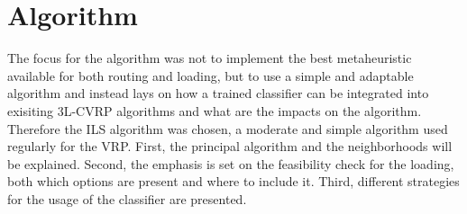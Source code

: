 \chapter{Algorithm}
\label{chap:algorithm}
The focus for the algorithm was not to implement the best metaheuristic available for both routing and loading, but
to use a simple and adaptable algorithm and instead lays on how a trained classifier can
be integrated into exisiting \gls{3L-CVRP} algorithms and what are the impacts on the algorithm. Therefore the \gls{ILS}
algorithm was chosen, a moderate and simple algorithm used regularly for the \gls{VRP}. First, the principal
algorithm and the neighborhoods will be explained. Second, the emphasis is set on the feasibility check for the loading,
both which options are present and where to include it. Third, different strategies for the usage of the
classifier are presented.

